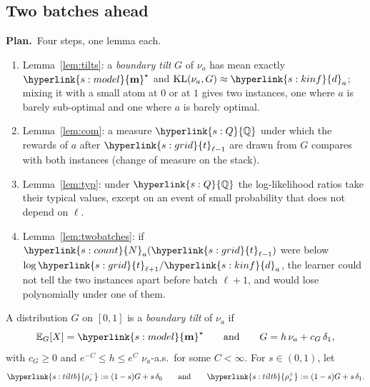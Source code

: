 \documentclass[10pt]{article}
\newcommand{\dt}[1]{\hypertarget{#1}{}}
\newcommand{\sy}[2]{{\hyperlink{#1}{#2}}}
\newcommand{\E}{\mathbb{E}}
\newcommand{\1}{\mathbf{1}}
\newcommand{\KL}{\mathrm{KL}}
\newcommand{\m}{\sy{s:model}{\mathbf{m}}}
\newcommand{\da}{\sy{s:kinf}{d}_a}
\newcommand{\Ng}{\sy{s:count}{N}}
\newcommand{\tl}{\sy{s:grid}{t}}
\newcommand{\rhom}{\sy{s:tiltb}{\rho^-_s}}
\newcommand{\rhop}{\sy{s:tiltb}{\rho^+_s}}
\newcommand{\QQ}{\sy{s:Q}{\mathbb Q}}
\newcommand{\Plan}{\par\smallskip\noindent\textbf{Plan.}\ }
\begin{document}
\subsection{Two batches ahead}\label{sec:app-lb-two}

\Plan Four steps, one lemma each.
\begin{enumerate}
\item[(1)] Lemma~\ref{lem:tilts}: a \emph{boundary tilt} $G$ of $\nu_a$ has mean exactly $\m^\star$ and $\KL(\nu_a,G)\approx\da$; mixing it with a small atom at $0$ or at $1$
gives two instances, one where $a$ is barely sub-optimal and one where $a$ is barely optimal.
\item[(2)] Lemma~\ref{lem:com}: a measure $\QQ$ under which the rewards of $a$ after $\tl_{\ell-1}$ are drawn from $G$ compares with both instances (change of measure on the stack).
\item[(3)] Lemma~\ref{lem:typ}: under $\QQ$ the log-likelihood ratios take their typical values, except on an event of small probability that does not depend on $\ell$.
\item[(4)] Lemma~\ref{lem:twobatches}: if $\Ng_a(\tl_{\ell-1})$ were below $\log\tl_{\ell+1}/\da$, the learner could not tell the two instances apart before batch $\ell+1$,
and would lose polynomially under one of them.
\end{enumerate}

\begin{definition}\label{def:tilt}\dt{s:tiltb}
A distribution $G$ on $[0,1]$ is a \emph{boundary tilt} of $\nu_a$ if
\[
\E_G[X]=\m^\star\qquad\text{and}\qquad G=h\,\nu_a+c_G\,\delta_1,
\]
with $c_G\ge0$ and $e^{-C}\le h\le e^C$ $\nu_a$-a.s.\ for some $C<\infty$. For $s\in(0,1)$, let
\[
\rhom:=(1-s)G+s\,\delta_0\qquad\text{and}\qquad\rhop:=(1-s)G+s\,\delta_1 .
\]
\end{definition}
\end{document}
